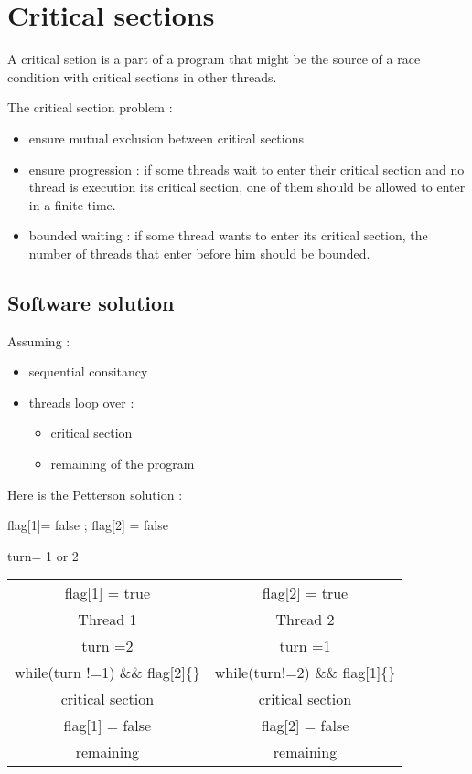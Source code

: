 \documentclass[a4paper,10pt]{article}
\begin{document}
\section{Critical sections}

A critical setion is a part of a program that might be the source of a race condition with critical sections in other threads.

The critical section problem :
\begin{itemize}
\item ensure mutual exclusion between critical sections
\item ensure progression : if some threads wait to enter their critical section and no thread is execution its critical section, one of them should be allowed to enter in a finite time.
\item bounded waiting : if some thread wants to enter its critical section, the number of threads that enter before him should be bounded. 
\end{itemize}

\subsection{Software solution}

Assuming :

\begin{itemize}
\item sequential consitancy
\item threads loop over :
\begin{itemize}
\item critical section
\item remaining of the program
\end{itemize}
\end{itemize}

Here is the Petterson solution :

\begin{centering}
flag[1]= false ; flag[2] = false

turn= 1 or 2

\begin{tabular}{|cc|}
\hline
	flag[1] = true & flag[2] = true\\
	Thread 1 & Thread 2 \\
	turn =2 & turn =1 \\
	while(turn !=1) \&\& flag[2]\{\} & while(turn!=2) \&\& flag[1]\{\}\\
	critical section & critical section\\
	flag[1] = false & flag[2] = false\\
	remaining & remaining\\
\hline
\end{tabular}

\end{centering}
\end{document}
